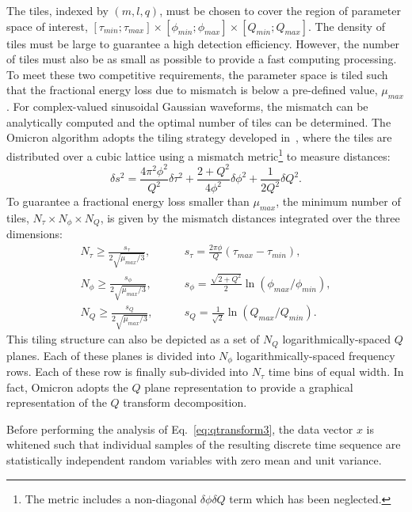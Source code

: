 The tiles, indexed by $(m,l,q)$, must be chosen to cover the region of parameter space of interest, $[\tau_{min};\tau_{max}]\times [\phi_{min};\phi_{max}] \times [Q_{min};Q_{max}]$. The density of tiles must be large to guarantee a high detection efficiency. However, the number of tiles must also be as small as possible to provide a fast computing processing. To meet these two competitive requirements, the parameter space is tiled such that the fractional energy loss due to mismatch is below a pre-defined value, $\mu_{max}$. For complex-valued sinusoidal Gaussian waveforms, the mismatch can be analytically computed and the optimal number of tiles can be determined. The Omicron algorithm adopts the tiling strategy developed in~\cite{Chatterji:2004}, where the tiles are distributed over a cubic lattice using a mismatch metric\footnote{The metric includes a non-diagonal $\delta \phi \delta Q$ term which has been neglected.} to measure distances:
\begin{equation}
  \delta s^2 =
  \frac{4\pi^2\phi^2}{Q^2}\delta \tau^2
  + \frac{2+Q^2}{4\phi^2}\delta \phi^2
  + \frac{1}{2Q^2}\delta Q^2.
  \label{eq:tilemetric}
\end{equation}
To guarantee a fractional energy loss smaller than $\mu_{max}$, the minimum number of tiles, $N_\tau \times N_\phi \times N_Q$, is given by the mismatch distances integrated over the three dimensions:
\begin{align}
  N_\tau \ge \frac{s_\tau}{2\sqrt{\mu_{max}/3}},  & \qquad s_\tau = \frac{2\pi\phi}{Q}(\tau_{max} - \tau_{min}), \label{eq:tiledistancetau} \\
  N_\phi \ge \frac{s_\phi}{2\sqrt{\mu_{max}/3}},  & \qquad s_\phi = \frac{\sqrt{2+Q^2}}{2}\ln(\phi_{max}/\phi_{min}), \label{eq:tiledistancephi} \\
  N_Q \ge \frac{s_Q}{2\sqrt{\mu_{max}/3}},  & \qquad s_Q = \frac{1}{\sqrt{2}}\ln(Q_{max}/Q_{min}). \label{eq:tiledistanceq}
\end{align}
This tiling structure can also be depicted as a set of $N_Q$ logarithmically-spaced $Q$ planes. Each of these planes is divided into $N_\phi$ logarithmically-spaced frequency rows. Each of these row is finally sub-divided into $N_\tau$ time bins of equal width. In fact, Omicron adopts the $Q$ plane representation to provide a graphical representation of the $Q$ transform decomposition.

Before performing the analysis of Eq.~\ref{eq:qtransform3}, the data vector $x$ is whitened such that individual samples of the resulting discrete time sequence are statistically independent random variables with zero mean and unit variance.
